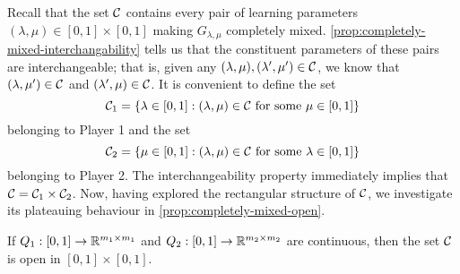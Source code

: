     Recall that the set $\mathcal{C}$ contains every pair of learning parameters $(\lambda, \mu) \in [0, 1] \times [0, 1]$ making $G_{\lambda, \mu}$ completely mixed.
    \autoref{prop:completely-mixed-interchangability} tells us that the constituent parameters of these pairs are interchangeable; that is, given any $(\lambda, \mu), (\lambda', \mu') \in \mathcal{C}$, we know that $(\lambda, \mu') \in \mathcal{C}$ and $(\lambda', \mu) \in \mathcal{C}$.
    It is convenient to define the set
    \begin{equation} \label{eq:completely-mixed-parameters-1}
        \mathcal{C}_1
            =
            \left\{
                \lambda \in [0, 1]
                : (\lambda, \mu) \in \mathcal{C} \text{ for some } \mu \in [0, 1]
            \right\}
    \end{equation}
    belonging to Player 1 and the set
    \begin{equation} \label{eq:completely-mixed-parameters-2}
        \mathcal{C}_2
            =
            \left\{
                \mu \in [0, 1]
                : (\lambda, \mu) \in \mathcal{C} \text{ for some } \lambda \in [0, 1]
            \right\}
    \end{equation}
    belonging to Player 2.
    The interchangeability property immediately implies that  $\mathcal{C} = \mathcal{C}_1 \times \mathcal{C}_2$.
    Now, having explored the rectangular structure of $\mathcal{C}$, we investigate its plateauing behaviour in \autoref{prop:completely-mixed-open}.

    \begin{proposition} \label{prop:completely-mixed-open}
        If $Q_1 : [0, 1] \to \mathbb{R}^{m_1 \times m_1}$ and $Q_2 : [0, 1] \to \mathbb{R}^{m_2 \times m_2}$ are continuous, then the set $\mathcal{C}$ is open in $[0, 1] \times [0, 1]$.
    \end{proposition}

